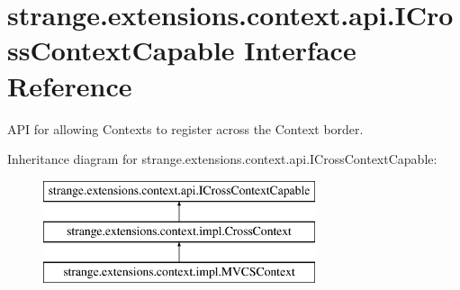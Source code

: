 \hypertarget{interfacestrange_1_1extensions_1_1context_1_1api_1_1_i_cross_context_capable}{\section{strange.\-extensions.\-context.\-api.\-I\-Cross\-Context\-Capable Interface Reference}
\label{interfacestrange_1_1extensions_1_1context_1_1api_1_1_i_cross_context_capable}
}


A\-P\-I for allowing Contexts to register across the Context border.  


Inheritance diagram for strange.\-extensions.\-context.\-api.\-I\-Cross\-Context\-Capable\-:\begin{figure}[H]
\begin{center}
\leavevmode
\includegraphics[height=3.000000cm]{interfacestrange_1_1extensions_1_1context_1_1api_1_1_i_cross_context_capable}
\end{center}
\end{figure}
